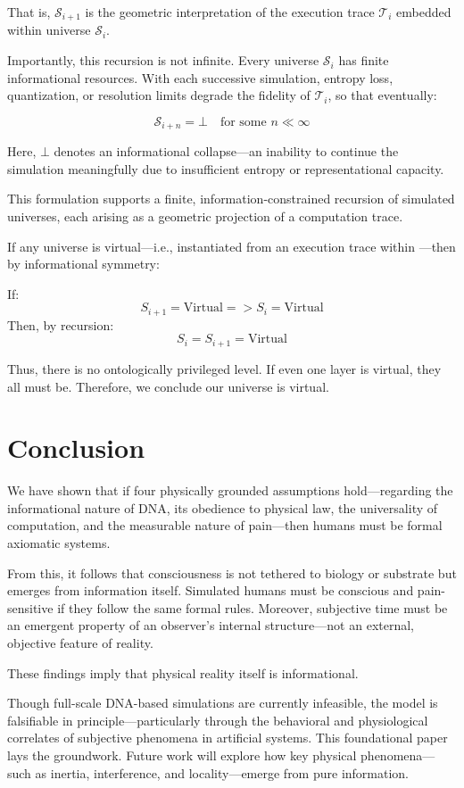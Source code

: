 \documentclass[11pt]{article}
\begin{document}
That is, \( \mathcal{S}_{i+1} \) is the geometric interpretation of the execution trace \( \mathcal{T}_i \) embedded within universe \( \mathcal{S}_i \).

Importantly, this recursion is not infinite. Every universe \( \mathcal{S}_i \) has finite informational resources. With each successive simulation, entropy loss, quantization, or resolution limits degrade the fidelity of \( \mathcal{T}_i \), so that eventually:

\[
  \mathcal{S}_{i+n} = \bot \quad \text{for some } n \ll \infty
\]

Here, \( \bot \) denotes an informational collapse—an inability to continue the simulation meaningfully due to insufficient entropy or representational capacity.

This formulation supports a finite, information-constrained recursion of simulated universes, each arising as a geometric projection of a computation trace.

If any universe  is virtual—i.e., instantiated from an execution trace within —then by informational symmetry:

If:
\[
  S_{i+1} = \text{Virtual} => S_{i} = \text{Virtual}
\]
Then, by recursion:
\[
  S_i = S_{i+1} = \text{Virtual}
\]

Thus, there is no ontologically privileged level. If even one layer is virtual, they all must be. Therefore, we conclude our universe is virtual.



\section{Conclusion}

We have shown that if four physically grounded assumptions hold—regarding the informational nature of DNA, its obedience to physical law, the universality of computation, and the measurable nature of pain—then humans must be formal axiomatic systems.

From this, it follows that consciousness is not tethered to biology or substrate but emerges from information itself. Simulated humans must be conscious and pain-sensitive if they follow the same formal rules. Moreover, subjective time must be an emergent property of an observer’s internal structure—not an external, objective feature of reality.

These findings imply that physical reality itself is informational.

Though full-scale DNA-based simulations are currently infeasible, the model is falsifiable in principle—particularly through the behavioral and physiological correlates of subjective phenomena in artificial systems. This foundational paper lays the groundwork. Future work will explore how key physical phenomena—such as inertia, interference, and locality—emerge from pure information.
\end{document}
